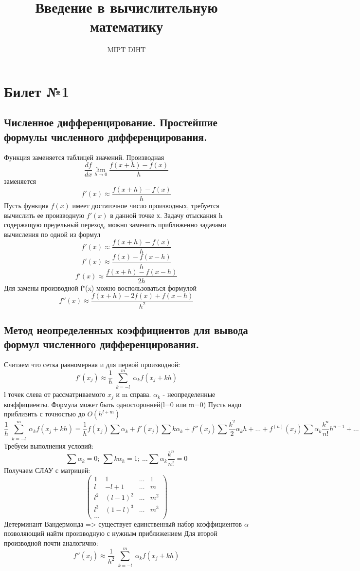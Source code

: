 \documentclass[a4paper]{article}
\title{Введение в вычислительную математику}
\author{MIPT DIHT}
\begin{document}
\maketitle

\section{Билет №1}
\subsection{Численное дифференцирование. Простейшие формулы численного дифференцирования.}
Функция заменяется таблицей значений. Производная $$\frac{df}{dx} \lim_{h \to 0} \frac{f(x + h) - f(x)}{h}$$ заменяется $$f'(x) \approx \frac{f(x + h) - f(x)}{h}$$
Пусть функция $f(x)$ имеет достаточное число производных, требуется вычислить ее производную $f'(x)$ в данной точке х. Задачу отыскания h содержащую предельный переход, можно заменить приближенно задачами вычисления по одной из формул
$$f'(x) \approx \frac{f(x + h) - f(x)}{h}$$
$$f'(x) \approx \frac{f(x) - f(x - h)}{h}$$
$$f'(x) \approx \frac{f(x + h) - f(x - h)}{2h}$$
Для замены производной f"(x) можно воспользоваться формулой
$$f''(x) \approx \frac{f(x + h) - 2f(x) + f(x - h)}{h^2}$$

\subsection{Метод неопределенных коэффициентов для вывода формул численного дифференцирования.}
Считаем что сетка равномерная и для первой производной:
$$ f'(x_j) \approx \frac{1}{h} \sum_{\substack{k=-l}}^m \alpha_k f(x_j +kh)$$
l точек слева от рассматриваемого $x_j$ и m справа. $\alpha_k$ - неопределенные коэффициенты. Формула может быть односторонней(l=0 или m=0)
Пусть надо приблизить с точностью до $O(h^{l+m})$
$$ \frac{1}{h} \sum_{\substack{k=-l}}^m \alpha_k f(x_j+kh) = \frac{1}{h}f(x_j)\sum \alpha_k + f'(x_j)\sum k\alpha_k + f''(x_j)\sum \frac{k^2}{2}\alpha_kh + \ldots + f^{(n)}(x_j) \sum \alpha_k \frac{k^n}{n!} h^{n-1} + \ldots$$
Требуем выполнения условий:
$$ \sum \alpha_k = 0;\ \sum k\alpha_h = 1;\ \ldots \sum \alpha_k \frac{k^n}{n!}=0 $$
Получаем СЛАУ с матрицей:
$$ \begin{pmatrix}
1 & 1 & \ldots & 1 \\
l & -l+1 & \ldots & m \\
l^2 & (l-1)^2 & \ldots & m^2 \\
l^3 & (1-l)^3 & \ldots & m^3 \\
\ldots
\end{pmatrix}$$
Детерминант Вандермонда => существует единственный набор коэффициентов $\alpha$ позволяющий найти производную с нужным приближением
Для второй производной почти аналогично:
$$ f''(x_j) \approx \frac{1}{h^2} \sum_{\substack{k=-l}}^m \alpha_k f(x_j +kh)$$
\end{document}

